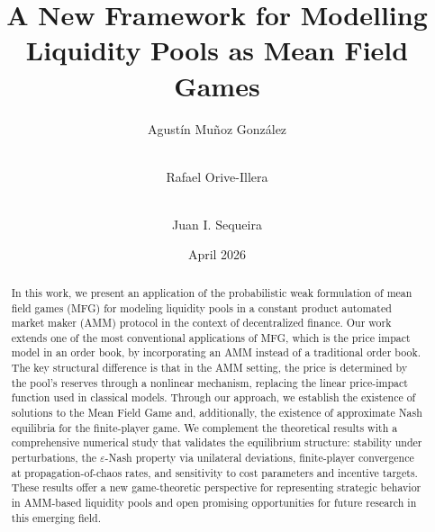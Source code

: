 \documentclass[11pt]{article}
\theoremstyle{definition}
\begin{document}
\title{A New Framework for Modelling Liquidity Pools as Mean Field Games}

\author[1]{Agustín Muñoz González}

\author[2,3]{\\ Rafael Orive-Illera}

\author[1,4]{\\ Juan I. Sequeira}





\date{April 2026}

\maketitle

\begin{abstract}
In this work, we present an application of the probabilistic weak formulation of mean field games (MFG) for modeling liquidity pools in a constant product automated market maker (AMM) protocol in the context of decentralized finance. Our work extends one of the most conventional applications of MFG, which is the price impact model in an order book, by incorporating an AMM instead of a traditional order book. The key structural difference is that in the AMM setting, the price is determined by the pool's reserves through a nonlinear mechanism, replacing the linear price-impact function used in classical models. Through our approach, we establish the existence of solutions to the Mean Field Game and, additionally, the existence of approximate Nash equilibria for the finite-player game. We complement the theoretical results with a comprehensive numerical study that validates the equilibrium structure: stability under perturbations, the $\varepsilon$-Nash property via unilateral deviations, finite-player convergence at propagation-of-chaos rates, and sensitivity to cost parameters and incentive targets. These results offer a new game-theoretic perspective for representing strategic behavior in AMM-based liquidity pools and open promising opportunities for future research in this emerging field.
\end{abstract}
\end{document}
